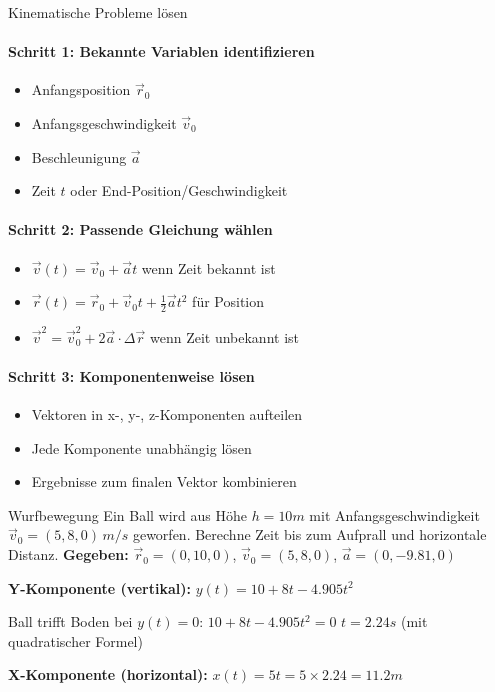 \begin{KR}{Kinematische Probleme lösen}
    \paragraph{Schritt 1: Bekannte Variablen identifizieren}
    \begin{itemize}
        \item Anfangsposition $\vec{r}_0$
        \item Anfangsgeschwindigkeit $\vec{v}_0$
        \item Beschleunigung $\vec{a}$
        \item Zeit $t$ oder End-Position/Geschwindigkeit
    \end{itemize}
    
    \paragraph{Schritt 2: Passende Gleichung wählen}
    \begin{itemize}
        \item $\vec{v}(t) = \vec{v}_0 + \vec{a}t$ wenn Zeit bekannt ist
        \item $\vec{r}(t) = \vec{r}_0 + \vec{v}_0 t + \frac{1}{2}\vec{a}t^2$ für Position
        \item $\vec{v}^2 = \vec{v}_0^2 + 2\vec{a} \cdot \Delta\vec{r}$ wenn Zeit unbekannt ist
    \end{itemize}
    
    \paragraph{Schritt 3: Komponentenweise lösen}
    \begin{itemize}
        \item Vektoren in x-, y-, z-Komponenten aufteilen
        \item Jede Komponente unabhängig lösen
        \item Ergebnisse zum finalen Vektor kombinieren
    \end{itemize}
\end{KR}

\begin{example2}{Wurfbewegung}
    Ein Ball wird aus Höhe $h = 10m$ mit Anfangsgeschwindigkeit $\vec{v}_0 = (5, 8, 0) \, m/s$ geworfen. Berechne Zeit bis zum Aufprall und horizontale Distanz.
    \tcblower
    \textbf{Gegeben:} $\vec{r}_0 = (0, 10, 0)$, $\vec{v}_0 = (5, 8, 0)$, $\vec{a} = (0, -9.81, 0)$
    
    \textbf{Y-Komponente (vertikal):}
    $y(t) = 10 + 8t - 4.905t^2$
    
    Ball trifft Boden bei $y(t) = 0$:
    $10 + 8t - 4.905t^2 = 0$
    $t = 2.24s$ (mit quadratischer Formel)
    
    \textbf{X-Komponente (horizontal):}
    $x(t) = 5t = 5 \times 2.24 = 11.2m$
\end{example2}

